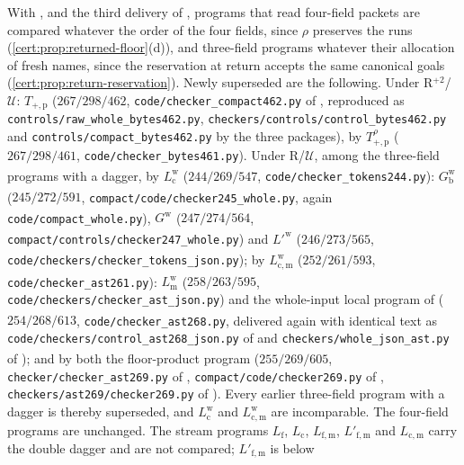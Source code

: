 With ,  and the third
delivery of , programs that read four-field packets are
compared whatever the order of the four fields, since $\rho$ preserves the runs
(\cref{cert:prop:returned-floor}(d)), and three-field programs whatever their
allocation of fresh names, since the reservation at return accepts the same
canonical goals (\cref{cert:prop:return-reservation}). Newly superseded are the
following. Under R$^{+2}$/$\mathcal U$: $T_{+,\mathrm p}$ ($267/298/462$,
\texttt{code/checker\_compact462.py} of , reproduced as
\texttt{controls/raw\_whole\_bytes462.py}, \texttt{checkers/controls/control\_bytes462.py}
and \texttt{controls/compact\_bytes462.py} by the three packages), by
$T^{\rho}_{+,\mathrm p}$ ($267/298/461$, \texttt{code/checker\_bytes461.py}). Under
R/$\mathcal U$, among the three-field programs with a dagger, by
$L^{\mathrm w}_{\mathrm c}$ ($244/269/547$\textsuperscript{\dag},
\texttt{code/checker\_tokens244.py}): $G^{\mathrm w}_{\mathrm b}$
($245/272/591$\textsuperscript{\dag}, \texttt{compact/code/checker245\_whole.py},
again \texttt{code/compact\_whole.py}), $G^{\mathrm w}$
($247/274/564$\textsuperscript{\dag}, \texttt{compact/controls/checker247\_whole.py})
and $L'^{\mathrm w}$ ($246/273/565$\textsuperscript{\dag},
\texttt{code/checkers/checker\_tokens\_json.py}); by $L^{\mathrm w}_{\mathrm{c,m}}$
($252/261/593$\textsuperscript{\dag}, \texttt{code/checker\_ast261.py}):
$L^{\mathrm w}_{\mathrm m}$ ($258/263/595$\textsuperscript{\dag},
\texttt{code/checkers/checker\_ast\_json.py}) and the whole-input local program of
 ($254/268/613$\textsuperscript{\dag},
\texttt{code/checker\_ast268.py}, delivered again with identical text as
\texttt{code/checkers/control\_ast268\_json.py} of  and
\texttt{checkers/whole\_json\_ast.py} of ); and by both the
floor-product program ($255/269/605$\textsuperscript{\dag},
\texttt{checker/checker\_ast269.py} of ,
\texttt{compact/code/checker269.py} of ,
\texttt{checkers/ast269/checker269.py} of ). Every earlier
three-field program with a dagger is thereby superseded, and
$L^{\mathrm w}_{\mathrm c}$ and $L^{\mathrm w}_{\mathrm{c,m}}$ are incomparable. The
four-field programs are unchanged. The stream programs $L_{\mathrm f}$,
$L_{\mathrm c}$, $L_{\mathrm{f,m}}$, $L'_{\mathrm{f,m}}$ and $L_{\mathrm{c,m}}$ carry
the double dagger and are not compared; $L'_{\mathrm{f,m}}$ is below
